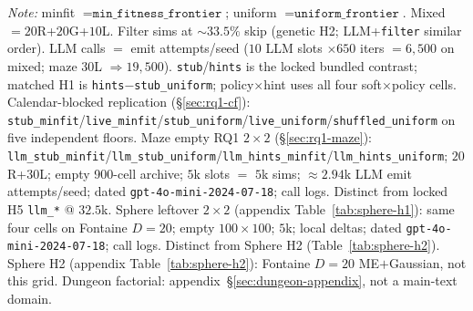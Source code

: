 \begin{table}[!htbp]
  \noindent\small\textit{Note:}
  minfit $=\texttt{min\_fitness\_frontier}$; uniform $=\texttt{uniform\_frontier}$.
  Mixed $=20$R+$20$G+$10$L.
  Filter sims at ${\sim}33.5\%$ skip (genetic H2; LLM+\texttt{filter} similar order).
  LLM calls $=$ emit attempts/seed ($10$ LLM slots $\times 650$ iters $=6{,}500$ on mixed; maze $30$L $\Rightarrow 19{,}500$).
  \texttt{stub}/\texttt{hints} is the locked bundled contrast; matched H1 is \texttt{hints}$-$\texttt{stub\_uniform}; policy$\times$hint uses all four soft$\times$policy cells.
  Calendar-blocked replication (\S\ref{sec:rq1-cf}): \texttt{stub\_minfit}/\texttt{live\_minfit}/\texttt{stub\_uniform}/\texttt{live\_uniform}/\texttt{shuffled\_uniform} on five independent floors.
  Maze empty RQ1 $2\times2$ (\S\ref{sec:rq1-maze}): \texttt{llm\_stub\_minfit}/\texttt{llm\_stub\_uniform}/\texttt{llm\_hints\_minfit}/\texttt{llm\_hints\_uniform}; $20$R+$30$L; empty 900-cell archive; $5$k slots $=$ $5$k sims; ${\approx}2.94$k LLM emit attempts/seed; dated \texttt{gpt-4o-mini-2024-07-18}; call logs. Distinct from locked H5 \texttt{llm\_*} @ $32.5$k.
  Sphere leftover $2\times2$ (appendix Table~\ref{tab:sphere-h1}): same four cells on Fontaine $D{=}20$; empty $100\times100$; $5$k; local deltas; dated \texttt{gpt-4o-mini-2024-07-18}; call logs. Distinct from Sphere H2 (Table~\ref{tab:sphere-h2}).
  Sphere H2 (appendix Table~\ref{tab:sphere-h2}): Fontaine $D{=}20$ ME$+$Gaussian, not this grid. Dungeon factorial: appendix~\S\ref{sec:dungeon-appendix}, not a main-text domain.
\end{table}

